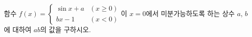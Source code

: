 함수 $f(x)=\begin{cases} \sin x+a & (x\ge 0) \\ bx-1 & (x<0) \end{cases}$이 $x=0$에서 미분가능하도록 하는 상수 $a$, $b$에 대하여 $ab$의 값을 구하시오.

